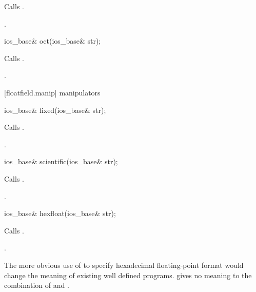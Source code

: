 \begin{itemdescr}
\pnum
\effects
Calls
.

\pnum
\returns
{}.
\end{itemdescr}

%
\begin{itemdecl}
ios_base& oct(ios_base& str);
\end{itemdecl}

\begin{itemdescr}
\pnum
\effects
Calls
.

\pnum
\returns
{}.
\end{itemdescr}

[floatfield.manip]{ manipulators}

%
\begin{itemdecl}
ios_base& fixed(ios_base& str);
\end{itemdecl}

\begin{itemdescr}
\pnum
\effects
Calls
.

\pnum
\returns
{}.
\end{itemdescr}

%
\begin{itemdecl}
ios_base& scientific(ios_base& str);
\end{itemdecl}

\begin{itemdescr}
\pnum
\effects
Calls
.

\pnum
\returns
{}.
\end{itemdescr}

%
\begin{itemdecl}
ios_base& hexfloat(ios_base& str);
\end{itemdecl}

\begin{itemdescr}
\pnum\effects Calls .

\pnum\returns {}.
\end{itemdescr}

\pnum
\enternote The more obvious use of
 to specify hexadecimal floating-point format would
change the meaning of existing well defined programs. \CppIII
gives no meaning to the combination of  and
.\exitnote

